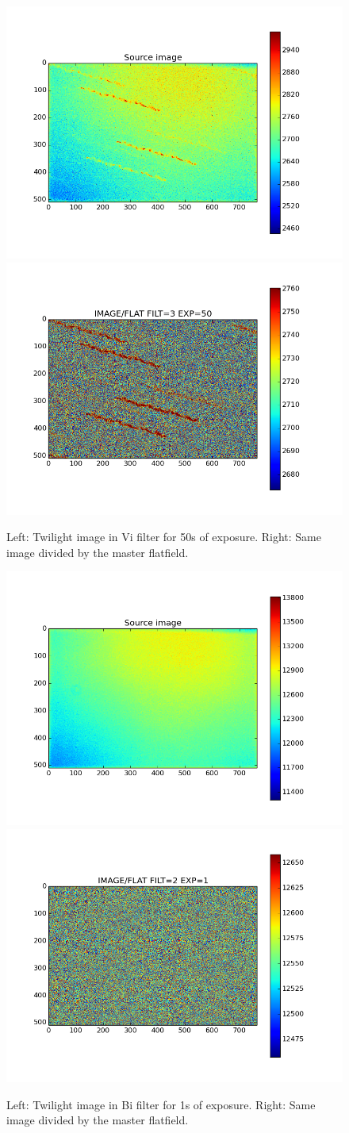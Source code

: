 \documentclass[\docopts]{\docclass}
\begin{document}
\begin{figure}
\centering
\includegraphics[width=0.45\linewidth]{source_image_filter=3_t=50.png}
\includegraphics[width=0.45\linewidth]{comp_flat_image_filter=3_t=50.png}
\caption{Left: Twilight image in Vi filter for 50s of exposure. Right:
  Same image divided by the master flatfield. }
\label{fig:twilight_image_f_3}
\end{figure}

\begin{figure}
\centering
\includegraphics[width=0.45\linewidth]{source_image_filter=2_t=1.png}
\includegraphics[width=0.45\linewidth]{comp_flat_image_filter=2_t=1.png}
\caption{Left: Twilight image in Bi filter for 1s of exposure. Right:
  Same image divided by the master flatfield. }
\label{fig:twilight_image_f_2}
\end{figure}
\end{document}
